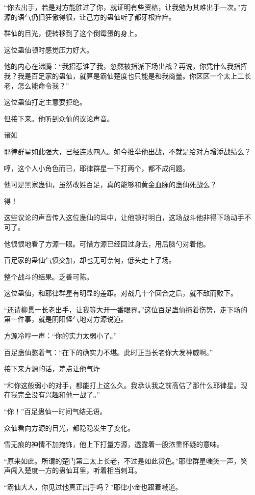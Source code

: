 \begin{this_body}
“你去出手，若是对方能胜过了你，就证明有些资格，让我勉为其难出手一次。”方源的语气仍旧狂傲得很，让己方的蛊仙听了都牙根痒痒。

群仙的目光，便转移到了这个倒霉蛋的身上。

这位蛊仙顿时感觉压力好大。

他的内心在沸腾：“我招惹谁了我，忽然被指派下场出战？再说，你凭什么我指挥我？我是百足家的蛊仙，就算是霸仙楚度也只能是和我商量。你区区一个太上二长老，怎么能命令我？”

这位蛊仙打定主意要拒绝。

但接下来。他听到众仙的议论声音。

诸如

耶律群星如此强大，已经连败四人。如今推举他出战，不就是给对方增添战绩么？

哼，这个人小角色而已，耶律群星一下打两个，都不成问题。

他可是黑家蛊仙，虽然改姓百足，真的能够和黄金血脉的蛊仙死战么？

得！

这些议论的声音传入这位蛊仙的耳中，让他顿时明白，这场战斗他非得下场动手不可了。

他恨恨地看了方源一眼。可惜方源已经回过身去，用后脑勺对着他。

百足家的蛊仙气愤交加，却也无可奈何，低头走上了场。

整个战斗的结果。乏善可陈。

这位蛊仙，和耶律群星有明显的差距。对战几十个回合之后，就不敌而败下。

“还请柳贯一长老出手，让我等大开一番眼界。”这位百足蛊仙拖着伤势，走下场的第一件事，就是阴阳怪气地对方源说道。

方源冷哼一声：“你的实力太弱小了。”

百足蛊仙憋着气：“在下的确实力不堪。此时正当长老你大发神威啊。”

接下来方源的话，差点让他气炸

“和你这般弱小的对手，都能打上这么久。我承认我之前高估了那什么耶律星。现在我完全没有兴趣和他一战了。”

“你！”百足蛊仙一时间气结无语。

众仙看向方源的目光，都隐隐发生了变化。

雪无痕的神情不加掩饰，他上下打量方源，透露着一股浓重怀疑的意味。

“原来如此。所谓的楚门第二太上长老，不过是如此货色。”耶律群星嗤笑一声，笑声闯入楚度一方的蛊仙耳里，听着相当刺耳。

“霸仙大人，你见过他真正出手吗？”耶律小金也跟着喊道。


\end{this_body}

